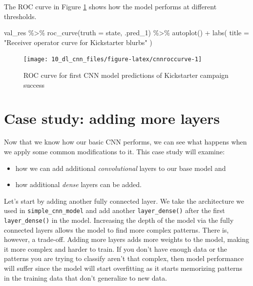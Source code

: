 \documentclass[
]{krantz}
\makeatletter
\newenvironment{Shaded}{\begin{snugshade}}{\end{snugshade}}
\newcommand{\AttributeTok}[1]{\textcolor[rgb]{0.77,0.63,0.00}{#1}}
\newcommand{\FunctionTok}[1]{\textcolor[rgb]{0.00,0.00,0.00}{#1}}
\newcommand{\NormalTok}[1]{#1}
\newcommand{\SpecialCharTok}[1]{\textcolor[rgb]{0.00,0.00,0.00}{#1}}
\newcommand{\StringTok}[1]{\textcolor[rgb]{0.31,0.60,0.02}{#1}}
\newenvironment{kframe}{%
\medskip{}
\setlength{\fboxsep}{.8em}
 \def\at@end@of@kframe{}%
 \ifinner\ifhmode%
  \def\at@end@of@kframe{\end{minipage}}%
  \begin{minipage}{\columnwidth}%
 \fi\fi%
 \def\FrameCommand##1{\hskip\@totalleftmargin \hskip-\fboxsep
 \colorbox{shadecolor}{##1}\hskip-\fboxsep
     \hskip-\linewidth \hskip-\@totalleftmargin \hskip\columnwidth}%
 \MakeFramed {\advance\hsize-\width
   \@totalleftmargin\z@ \linewidth\hsize
   \@setminipage}}%
 {\par\unskip\endMakeFramed%
 \at@end@of@kframe}
\renewenvironment{Shaded}{\begin{kframe}}{\end{kframe}}
\makeatother
\begin{document}
The ROC curve in Figure \ref{fig:cnnroccurve} shows how the model performs at different thresholds.

\begin{Shaded}
\begin{Highlighting}[]
\NormalTok{val\_res }\SpecialCharTok{\%\textgreater{}\%}
  \FunctionTok{roc\_curve}\NormalTok{(}\AttributeTok{truth =}\NormalTok{ state, .pred\_1) }\SpecialCharTok{\%\textgreater{}\%}
  \FunctionTok{autoplot}\NormalTok{() }\SpecialCharTok{+}
  \FunctionTok{labs}\NormalTok{(}
    \AttributeTok{title =} \StringTok{"Receiver operator curve for Kickstarter blurbs"}
\NormalTok{  )}
\end{Highlighting}
\end{Shaded}

\begin{figure}

{\centering \texttt{[image: 10\_dl\_cnn\_files/figure-latex/cnnroccurve-1]} 

}

\caption{ROC curve for first CNN model predictions of Kickstarter campaign success}\label{fig:cnnroccurve}
\end{figure}

\hypertarget{case-study-adding-more-layers}{%
\section{Case study: adding more layers}\label{case-study-adding-more-layers}}

Now that we know how our basic CNN performs, we can see what happens when we apply some common modifications to it.
This case study will examine:

\begin{itemize}
\item
  how we can add additional \emph{convolutional} layers to our base model and
\item
  how additional \emph{dense} layers can be added.
\end{itemize}

Let's start by adding another fully connected layer. We take the architecture we used in \texttt{simple\_cnn\_model} and add another \texttt{layer\_dense()} after the first \texttt{layer\_dense()} in the model.
Increasing the depth of the model via the fully connected layers allows the model to find more complex patterns.
There is, however, a trade-off. Adding more layers adds more weights to the model, making it more complex and harder to train. If you don't have enough data or the patterns you are trying to classify aren't that complex, then model performance will suffer since the model will start overfitting as it starts memorizing patterns in the training data that don't generalize to new data.
\end{document}
